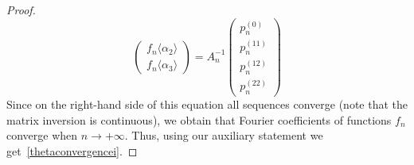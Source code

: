 \documentclass[10pt,a4paper]{amsart}
\begin{document}
\begin{proof}
\[\begin{pmatrix}
			f_n\langle \alpha_2 \rangle \\ f_n\langle \alpha_3 \rangle
		\end{pmatrix} = A_n^{-1}
		\begin{pmatrix}
			p_n^{(0)} \\ p_n^{(11)} \\ p_n^{(12)} \\ p_n^{(22)}
		\end{pmatrix}
		\]
		Since on the right-hand side of this equation all sequences converge (note that the matrix inversion is continuous), we obtain that Fourier coefficients of functions $f_n$ converge when $n \to +\infty$. Thus, using our auxiliary statement we get~\ref{thetaconvergencei}.
	\end{proof}
\end{document}
